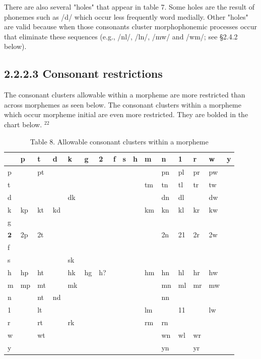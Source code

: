 \documentclass[10pt]{article}
\begin{document}
There are also several "holes" that appear in table 7. Some holes are the result of phonemes such as /d/ which occur less frequently word medially. Other "holes" are valid because when those consonants cluster morphophonemic processes occur that eliminate these sequences (e.g., /nl/, /ln/, /mw/ and /wm/; see §2.4.2 below).

\subsection*{2.2.2.3 Consonant restrictions}
The consonant clusters allowable within a morpheme are more restricted than across morphemes as seen below. The consonant clusters within a morpheme which occur morpheme initial are even more restricted. They are bolded in the chart below. \({ }^{22}\)

\begin{table}[h]
\begin{center}
\captionsetup{labelformat=empty}
\caption{Table 8. Allowable consonant clusters within a morpheme}
\begin{tabular}{|l|l|l|l|l|l|l|l|l|l|l|l|l|l|l|l|}
\hline
 & p & t & d & k & g & 2 & f & s & h & m & n & 1 & r & w & y \\
\hline
p &  & pt &  &  &  &  &  &  &  &  & pn & pl & pr & pw &  \\
\hline
t &  &  &  &  &  &  &  &  &  & tm & tn & tl & tr & tw &  \\
\hline
d &  &  &  & dk &  &  &  &  &  &  & dn & dl &  & dw &  \\
\hline
k & kp & kt & kd &  &  &  &  &  &  & km & kn & kl & kr & kw &  \\
\hline
g &  &  &  &  &  &  &  &  &  &  &  &  &  &  &  \\
\hline
\(\mathbf{2}\) & 2p & 2t &  &  &  &  &  &  &  &  & 2n & 21 & 2r & 2w &  \\
\hline
f &  &  &  &  &  &  &  &  &  &  &  &  &  &  &  \\
\hline
s &  &  &  & sk &  &  &  &  &  &  &  &  &  &  &  \\
\hline
h & hp & ht &  & hk & hg & h? &  &  &  & hm & hn & hl & hr & hw &  \\
\hline
m & mp & mt &  & mk &  &  &  &  &  &  & mn & ml & mr & mw &  \\
\hline
n &  & nt & nd &  &  &  &  &  &  &  & nn &  &  &  &  \\
\hline
1 &  & lt &  &  &  &  &  &  &  & lm &  & 11 &  & lw &  \\
\hline
r &  & rt &  & rk &  &  &  &  &  & rm & rn &  &  &  &  \\
\hline
w &  & wt &  &  &  &  &  &  &  &  & wn & wl & wr &  &  \\
\hline
y &  &  &  &  &  &  &  &  &  &  & yn &  & yr &  &  \\
\hline
\end{tabular}
\end{center}
\end{table}
\end{document}
